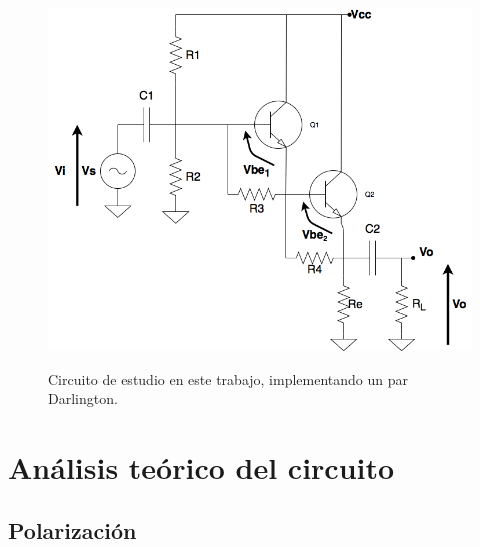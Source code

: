 \begin{figure}[H]
	\centering
		\includegraphics[scale=0.4]{../darlington_tp.png} \\
	\caption{Circuito de estudio en este trabajo, implementando un par Darlington.}
	\label{darlington_tp}
\end{figure}


\section{An\'alisis te\'orico del circuito}

	\subsection{Polarizaci\'on}
		
